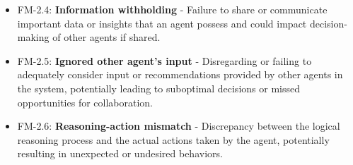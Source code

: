 \begin{itemize}
\item FM-2.4: \textbf{Information withholding} - Failure to share or communicate important data or insights that an agent possess and could impact decision-making of other agents if shared.


\item FM-2.5: \textbf{Ignored other agent's input} - Disregarding or failing to adequately consider input or recommendations provided by other agents in the system, potentially leading to suboptimal decisions or missed opportunities for collaboration.


\item FM-2.6: \textbf{Reasoning-action mismatch} - Discrepancy between the logical reasoning process and the actual actions taken by the agent, potentially resulting in unexpected or undesired behaviors.

\end{itemize}


